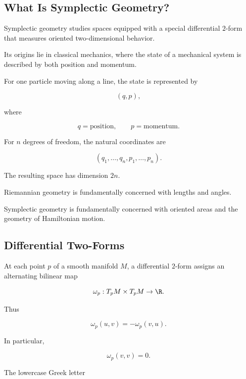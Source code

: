 \subsection{What Is Symplectic Geometry?}
\label{subsec:what-is-symplectic-geometry}

Symplectic geometry studies spaces equipped with a special differential
\(2\)-form that measures oriented two-dimensional behavior.

Its origins lie in classical mechanics, where the state of a mechanical
system is described by both position and momentum.

For one particle moving along a line, the state is represented by

\[
(q,p),
\]

where

\[
q=\text{position},
\qquad
p=\text{momentum}.
\]

For \(n\) degrees of freedom, the natural coordinates are

\[
\boxed{
(q_1,\ldots,q_n,p_1,\ldots,p_n).
}
\]

The resulting space has dimension \(2n\).

\begin{conceptbox}
Riemannian geometry is fundamentally concerned with lengths and angles.

Symplectic geometry is fundamentally concerned with oriented areas and the
geometry of Hamiltonian motion.
\end{conceptbox}

\subsection{Differential Two-Forms}
\label{subsec:symplectic-two-forms}

At each point \(p\) of a smooth manifold \(M\), a differential \(2\)-form
assigns an alternating bilinear map

\[
\omega_p:T_pM\times T_pM\to\R.
\]

Thus

\[
\boxed{
\omega_p(u,v)=-\omega_p(v,u).
}
\]

In particular,

\[
\boxed{
\omega_p(v,v)=0.
}
\]

The lowercase Greek letter

